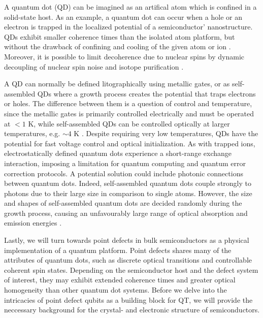 A quantum dot (QD) can be imagined as an artifical atom which is confined in a solid-state host. As an example, a quantum dot can occur when a hole or an electron is trapped in the localized potential of a semiconductor' nanostructure. QDs exhibit smaller coherence times than the isolated atom platform, but without the drawback of confining and cooling of the given atom or ion \cite{Acin2018}. Moreover, it is possible to limit decoherence due to nuclear spins by dynamic decoupling of nuclear spin noise and isotope purification \cite{Ladd2010}.

A QD can normally be defined litographically using metallic gates, or as self-assembled QDs where a growth process creates the potential that traps electrons or holes. The difference between them is a question of control and temperature, since the metallic gates is primarily controlled electrically and must be operated at $<1$ K, while self-assembled QDs can be controlled optically at larger temperatures, e.g.  $\sim 4$ K \cite{Ladd2010}. %
Despite requiring very low temperatures, QDs have the potential for fast voltage control and optical initialization. As with trapped ions, electrostatically defined quantum dots experience a short-range exchange interaction, imposing a limitation for quantum computing and quantum error correction protocols. A potential solution could include photonic connections between quantum dots. Indeed, self-assembled quantum dots couple strongly to photons due to their large size in comparison to single atoms. However, the size and shapes of self-assembled quantum dots are decided randomly during the growth process, causing an unfavourably large range of optical absorption and emission energies \cite{Ladd2010}.




Lastly, we will turn towards point defects in bulk semiconductors as a physical implementation of a quantum platform. Point defects shares many of the attributes of quantum dots, such as discrete optical transitions and controllable coherent spin states. %
Depending on the semiconductor host and the defect system of interest, they may exhibit extended coherence times and greater optical homogeneity than other quantum dot systems. Before we delve into the intricacies of point defect qubits as a building block for QT, we will provide the neccessary background for the crystal- and electronic structure of semiconductors.   %

